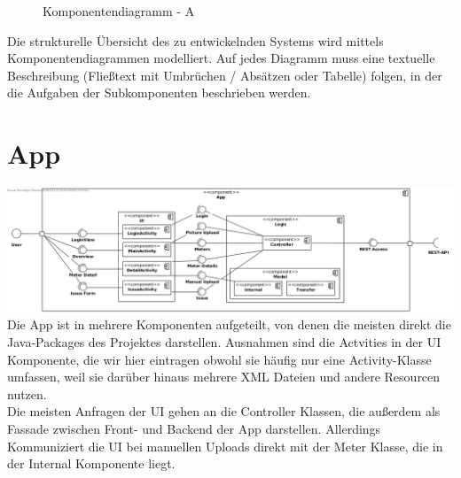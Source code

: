 \begin{figure}[h]
	\centering
	\caption{Komponentendiagramm - A}
	\label{fig:komponentendiagramm-a}
\end{figure}

\begin{tcolorbox}
Die strukturelle Übersicht des zu entwickelnden Systems wird mittels Komponentendiagrammen modelliert. 
Auf jedes Diagramm muss eine textuelle Beschreibung (Fließtext mit Umbrüchen / Absätzen oder Tabelle) folgen, in der die Aufgaben der Subkomponenten beschrieben werden. 
\end{tcolorbox}
\section{App}
\includegraphics[scale=0.45]{img/diagrams/AppComponentDiagram} 
Die App ist in mehrere Komponenten aufgeteilt, von denen die meisten direkt die Java-Packages des Projektes darstellen. Ausnahmen sind die Actvities in der UI Komponente, die wir hier eintragen obwohl sie häufig nur eine Activity-Klasse umfassen, weil sie darüber hinaus mehrere XML Dateien und andere Resourcen nutzen.\\
Die meisten Anfragen der UI gehen an die Controller Klassen, die außerdem als Fassade zwischen Front- und Backend der App darstellen. Allerdings Kommuniziert die UI bei manuellen Uploads direkt mit der Meter Klasse, die in der Internal Komponente liegt.\\ 


